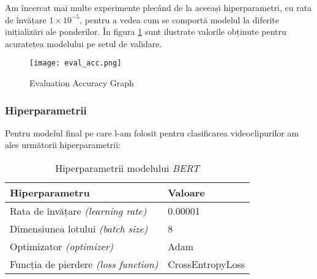 \par
Am încercat mai multe experimente plecând de la aceeași hiperparametri, cu rata de învățare $1 \times 10^{-5}$,
pentru a vedea cum se comportă modelul la diferite inițializări ale ponderilor. În figura \ref{fig:eval_acc}
sunt ilustrate valorile obținute pentru acuratețea modelului pe setul de validare.


\begin{figure}[h]
    \centering
    \texttt{[image: eval\_acc.png]}
    \caption{Evaluation Accuracy Graph}
    \label{fig:eval_acc}
\end{figure}

\subsubsection{Hiperparametrii}
Pentru modelul final pe care l-am folosit pentru clasificarea videoclipurilor am ales următorii hiperparametrii:


\begin{table}[ht]
    \centering
    \begin{tabular}{@{}ll@{}}
        \toprule
        \textbf{Hiperparametru}   & \textbf{Valoare}         \\
        \midrule
        Rata de învățare \textit{(learning rate)}             & 0.00001                  \\
        Dimensiunea lotului \textit{(batch size)}             & 8                        \\
        Optimizator \textit{(optimizer)}                      & Adam                     \\
        Funcția de pierdere \textit{(loss function)}          & CrossEntropyLoss         \\
        \bottomrule
    \end{tabular}
    \caption{Hiperparametrii modelului \textit{BERT}}
    \label{tab:bert-hyperparameters}
\end{table}


